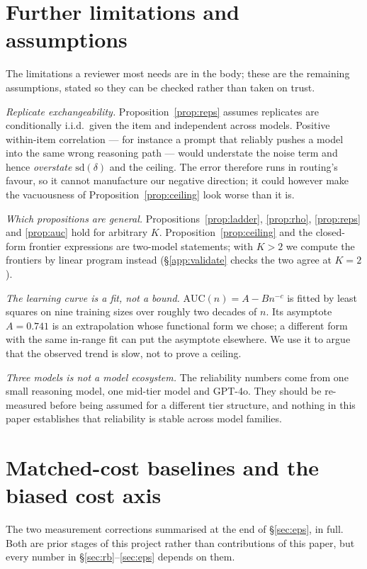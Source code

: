 \section{Further limitations and assumptions}\label{app:limits}

The limitations a reviewer most needs are in the body; these are the remaining
assumptions, stated so they can be checked rather than taken on trust.

\emph{Replicate exchangeability.} Proposition~\ref{prop:reps} assumes replicates
are conditionally i.i.d.\ given the item and independent across models. Positive
within-item correlation --- for instance a prompt that reliably pushes a model
into the same wrong reasoning path --- would understate the noise term and hence
\emph{overstate} $\mathrm{sd}(\delta)$ and the ceiling. The error therefore runs
in routing's favour, so it cannot manufacture our negative direction; it could
however make the vacuousness of Proposition~\ref{prop:ceiling} look worse than
it is.

\emph{Which propositions are general.} Propositions~\ref{prop:ladder},
\ref{prop:rho}, \ref{prop:reps} and \ref{prop:auc} hold for arbitrary $K$.
Proposition~\ref{prop:ceiling} and the closed-form frontier expressions are
two-model statements; with $K>2$ we compute the frontiers by linear program
instead (\S\ref{app:validate} checks the two agree at $K=2$).

\emph{The learning curve is a fit, not a bound.} $\mathrm{AUC}(n)=A-Bn^{-c}$ is
fitted by least squares on nine training sizes over roughly two decades of $n$.
Its asymptote $A=0.741$ is an extrapolation whose functional form we chose; a
different form with the same in-range fit can put the asymptote elsewhere. We
use it to argue that the observed trend is slow, not to prove a ceiling.

\emph{Three models is not a model ecosystem.} The reliability numbers come from
one small reasoning model, one mid-tier model and GPT-4o. They should be
re-measured before being assumed for a different tier structure, and nothing in
this paper establishes that reliability is stable across model families.

\section{Matched-cost baselines and the biased cost axis}\label{sec:cost}

The two measurement corrections summarised at the end of \S\ref{sec:eps}, in
full. Both are prior stages of this project rather than contributions of this
paper, but every number in \S\ref{sec:rb}--\ref{sec:eps} depends on them.

